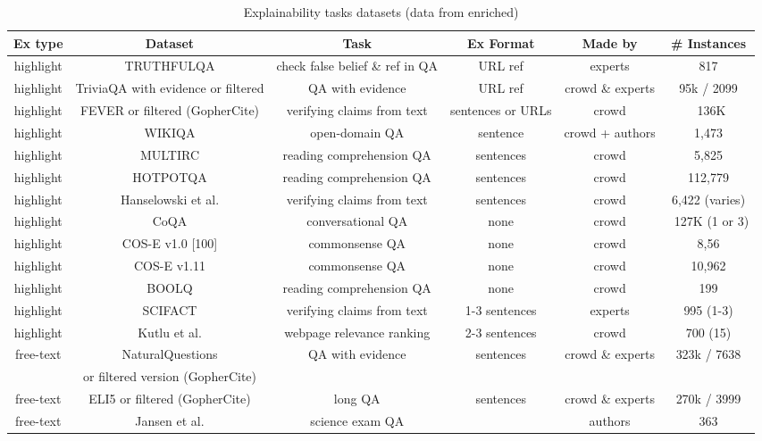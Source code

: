 \documentclass[acmsmall]{acmart}
\begin{document}
\begin{table}
\captionsetup{skip=1pt} %
\caption{Explainability tasks datasets (data from \citet{wiegreffeTeachMeExplain2021} enriched)}
\label{TableExplDatasets}
\scriptsize
\begin{tabular}{T T T T T T}
\toprule
Ex type & Dataset & Task & Ex Format & Made by & \# Instances \\ \midrule
highlight & TRUTHFULQA & check false belief \& ref in QA & URL ref & experts & 817 \\ 
highlight & TriviaQA with evidence or filtered & QA with evidence & URL ref & crowd \& experts & 95k / 2099 \\ 
highlight & FEVER  or filtered (GopherCite) & verifying claims from text & sentences or URLs & crowd & ~136K \\ 
highlight & WIKIQA & open-domain QA & sentence & crowd + authors & 1,473 \\ 
highlight & MULTIRC & reading comprehension QA & sentences & crowd & 5,825 \\ 
highlight & HOTPOTQA & reading comprehension QA & sentences & crowd & 112,779 \\ 
highlight & Hanselowski et al. & verifying claims from text & sentences & crowd & 6,422 (varies) \\ 
highlight & CoQA & conversational QA & none & crowd & ~127K (1 or 3) \\ 
highlight & COS-E v1.0 [100] & commonsense QA & none & crowd & 8,56 \\ 
highlight & COS-E v1.11 & commonsense QA & none & crowd & 10,962 \\ 
highlight & BOOLQ & reading comprehension QA & none & crowd & 199 \\ 
highlight & SCIFACT & verifying claims from text & 1-3 sentences & experts & 995 (1-3) \\ 
highlight & Kutlu et al. & webpage relevance ranking & 2-3 sentences & crowd & 700 (15) \\ 
free-text & NaturalQuestions & QA with evidence & sentences & crowd \& experts & 323k / 7638 \\
& or filtered version (GopherCite) \\
free-text & ELI5 or filtered (GopherCite) & long QA & sentences & crowd \& experts & 270k / 3999 \\ 
free-text & Jansen et al. & science exam QA &  & authors & 363 \\ 

\end{tabular}
\end{table}
\end{document}
